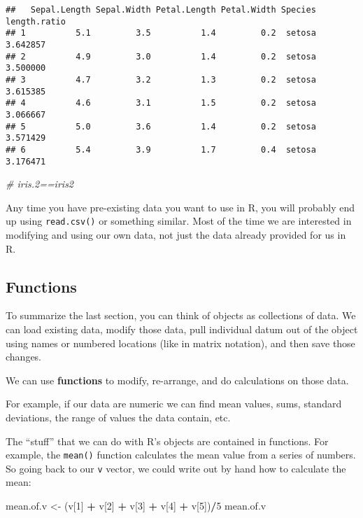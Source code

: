 \documentclass[]{article}
\newenvironment{Shaded}{\begin{snugshade}}{\end{snugshade}}
\newcommand{\DecValTok}[1]{\textcolor[rgb]{0.00,0.00,0.81}{#1}}
\newcommand{\StringTok}[1]{\textcolor[rgb]{0.31,0.60,0.02}{#1}}
\newcommand{\CommentTok}[1]{\textcolor[rgb]{0.56,0.35,0.01}{\textit{#1}}}
\newcommand{\OperatorTok}[1]{\textcolor[rgb]{0.81,0.36,0.00}{\textbf{#1}}}
\newcommand{\NormalTok}[1]{#1}
\begin{document}
\begin{verbatim}
##   Sepal.Length Sepal.Width Petal.Length Petal.Width Species length.ratio
## 1          5.1         3.5          1.4         0.2  setosa     3.642857
## 2          4.9         3.0          1.4         0.2  setosa     3.500000
## 3          4.7         3.2          1.3         0.2  setosa     3.615385
## 4          4.6         3.1          1.5         0.2  setosa     3.066667
## 5          5.0         3.6          1.4         0.2  setosa     3.571429
## 6          5.4         3.9          1.7         0.4  setosa     3.176471
\end{verbatim}

\begin{Shaded}
\begin{Highlighting}[]
\CommentTok{# iris.2==iris2 }
\end{Highlighting}
\end{Shaded}

Any time you have pre-existing data you want to use in R, you will
probably end up using \texttt{read.csv()} or something similar. Most of
the time we are interested in modifying and using our own data, not just
the data already provided for us in R.

\subsection{Functions}\label{functions}

To summarize the last section, you can think of objects as collections
of data. We can load existing data, modify those data, pull individual
datum out of the object using names or numbered locations (like in
matrix notation), and then save those changes.

We can use \textbf{functions} to modify, re-arrange, and do calculations
on those data.

For example, if our data are numeric we can find mean values, sums,
standard deviations, the range of values the data contain, etc.

The ``stuff'' that we can do with R's objects are contained in
functions. For example, the \texttt{mean()} function calculates the mean
value from a series of numbers. So going back to our \texttt{v} vector,
we could write out by hand how to calculate the mean:

\begin{Shaded}
\begin{Highlighting}[]
\NormalTok{mean.of.v <-}\StringTok{ }\NormalTok{(v[}\DecValTok{1}\NormalTok{] }\OperatorTok{+}\StringTok{ }\NormalTok{v[}\DecValTok{2}\NormalTok{] }\OperatorTok{+}\StringTok{ }\NormalTok{v[}\DecValTok{3}\NormalTok{] }\OperatorTok{+}\StringTok{ }\NormalTok{v[}\DecValTok{4}\NormalTok{] }\OperatorTok{+}\StringTok{ }\NormalTok{v[}\DecValTok{5}\NormalTok{])}\OperatorTok{/}\DecValTok{5}
\NormalTok{mean.of.v}
\end{Highlighting}
\end{Shaded}
\end{document}
